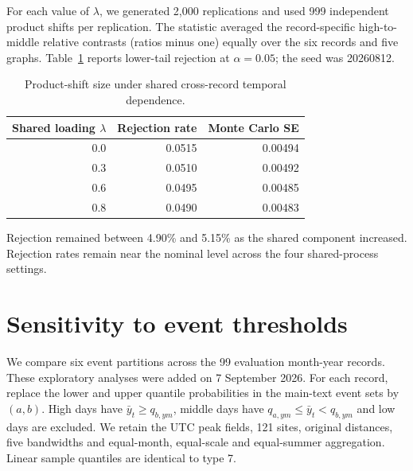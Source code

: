 \documentclass[namedate,webpdf,modern,mediumone]{oup-authoring-template}
\theoremstyle{thmstyleone}
\begin{document}
For each value of $\lambda$, we generated 2,000 replications and used 999
independent product shifts per replication. The statistic averaged the
record-specific high-to-middle relative contrasts (ratios minus one) equally
over the six records and five graphs. Table~\ref{tab:cross-record-stress}
reports lower-tail rejection at
$\alpha=0.05$; the seed was 20260812.

\begin{table}[htbp]
\centering
\caption{Product-shift size under shared cross-record temporal dependence.}
\label{tab:cross-record-stress}
\small
\setlength{\tabcolsep}{8pt}
\begin{tabular}{rrr}
\toprule
Shared loading $\lambda$ & Rejection rate & Monte Carlo SE \\
\midrule
0.0 & 0.0515 & 0.00494 \\
0.3 & 0.0510 & 0.00492 \\
0.6 & 0.0495 & 0.00485 \\
0.8 & 0.0490 & 0.00483 \\
\bottomrule
\end{tabular}
\end{table}

Rejection remained between 4.90\% and 5.15\% as the shared component increased.
Rejection rates remain near the nominal level across the four shared-process
settings.


\section{Sensitivity to event thresholds}
\label{sec:partitions}
We compare six event partitions across the 99 evaluation month-year records.
These exploratory analyses were added on 7 September 2026.
For each record, replace the lower and upper
quantile probabilities in the main-text event sets by $(a,b)$. High days have
$\bar y_t\ge q_{b,ym}$, middle days have
$q_{a,ym}\le\bar y_t<q_{b,ym}$ and low days are excluded. We retain the UTC
peak fields, 121 sites, original distances, five bandwidths and equal-month,
equal-scale and equal-summer aggregation. Linear sample quantiles are
identical to type 7.
\end{document}
